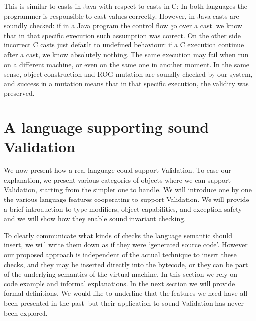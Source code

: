 This is similar to casts in Java with respect to casts in C:
In both languages the programmer is responsible to cast values correctly.
However, in Java casts are soundly checked: if in a Java program the control flow go over a cast,
we know that in that specific
execution such assumption was correct.
On the other side incorrect C casts just default to undefined behaviour:
if a C execution continue after a cast, we know absolutely nothing. The same execution
may fail when run on a different machine, 
or even on the same one in another moment.
In the same sense, object construction and ROG mutation are soundly checked by our system,
and success in a mutation means that in that specific execution, the validity was preserved.




%
%  
% 
%
%
%
%
%
%
%
%
%
%
%
%
%
%
%
%
%



\saveSpace
\section{A language supporting sound Validation}
\label{s:language}
\saveSpace
We now present how a real language could support
Validation. To ease our explanation, we present various categories
of objects where we can support Validation, starting from the simpler one to handle.
We will introduce one by one the various
language features cooperating
to support Validation.%
We will provide a brief introduction to type modifiers, object capabilities, and exception safety and we will show how they enable sound invariant checking.

To clearly communicate what kinds of checks the language semantic should insert,
 we will write them down as if they were `generated source code'. 
However our proposed approach is independent of the actual technique to insert these checks, and they may be inserted directly into the bytecode, or they can be part of the underlying semantics of the virtual machine.
In this section we rely on code example and informal explanations. In the next section we will provide formal definitions.
We would like to underline that the
features we need have all been presented in the past, but their application to sound Validation has never been explored.



